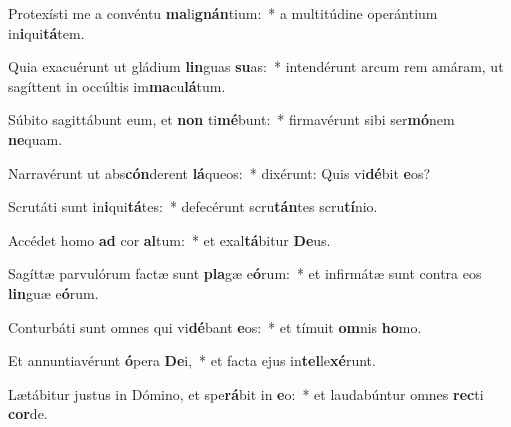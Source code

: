\item Protexísti me a convéntu \textbf{ma}li\textbf{gnán}tium:~* a multitúdine operántium in\textbf{i}qui\textbf{tá}tem.
\item Quia exacuérunt ut gládium \textbf{lin}guas \textbf{su}as:~* intendérunt arcum rem amáram, ut sagíttent in occúltis im\textbf{ma}cu\textbf{lá}tum.
\item Súbito sagittábunt eum, et \textbf{non} ti\textbf{mé}bunt:~* firmavérunt sibi ser\textbf{mó}nem \textbf{ne}quam.
\item Narravérunt ut abs\textbf{cón}derent \textbf{lá}queos:~* dixérunt: Quis vi\textbf{dé}bit \textbf{e}os?
\item Scrutáti sunt in\textbf{i}qui\textbf{tá}tes:~* defecérunt scru\textbf{tán}tes scru\textbf{tí}nio.
\item Accédet homo \textbf{ad} cor \textbf{al}tum:~* et exal\textbf{tá}bitur \textbf{De}us.
\item Sagíttæ parvulórum factæ sunt \textbf{pla}gæ e\textbf{ó}rum:~* et infirmátæ sunt contra eos \textbf{lin}guæ e\textbf{ó}rum.
\item Conturbáti sunt omnes qui vi\textbf{dé}bant \textbf{e}os:~* et tímuit \textbf{om}nis \textbf{ho}mo.
\item Et annuntiavérunt \textbf{ó}pera \textbf{De}i,~* et facta ejus in\textbf{tel}le\textbf{xé}runt.
\item Lætábitur justus in Dómino, et spe\textbf{rá}bit in \textbf{e}o:~* et laudabúntur omnes \textbf{rec}ti \textbf{cor}de.
